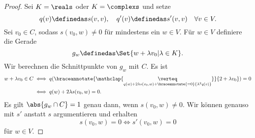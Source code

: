 \begin{proof}
  Sei \( K=\reals \) oder \( K=\complexs \) und setze
  \begin{equation*}
    q(v)\definedas s(v,v),\quad q'(v)\definedas s'(v,v)\quad \forall v\in V.
  \end{equation*}
  Sei \( v_0\in C \), sodass \( s(v_0,w)\neq 0 \) für mindestens ein \( w\in V \). Für \( w\in V \) definiere die Gerade
  \begin{equation*}
    g_w\definedas \Set{w+\lambda v_0|\lambda\in K}.
  \end{equation*}
  Wir berechnen die Schnittpunkte von \( g_w \) mit \( C \). Es ist
  \begin{align*}
    w+\lambda v_0\in C&\iff q(\braceannotate{\mathclap{\underset{q(w)+2\lambda s(v_0,w)+\braceannotate{=0}{\lambda^2 q(v)}}{\verteq}}}{2+\lambda v_0})=0\\
    &\iff q(w)+2\lambda s(v_0,w)=0.
  \end{align*}
  Es gilt \( \abs{g_w\cap C}=1 \) genau dann, wenn \( s(v_0,w)\neq 0 \). Wir können genauso mit \( s' \) anstatt \( s \) argumentieren und erhalten
  \begin{equation*}
    s(v_0,w)=0 \iff s'(v_0,w)=0
  \end{equation*}
  für \( w\in V \).


\end{proof}
